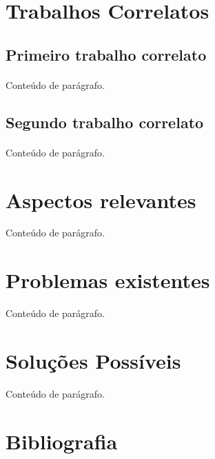 \documentclass[12pt]{article}
\begin{document}
\section{Trabalhos Correlatos} \label{sec:correlated}
\subsection{Primeiro trabalho correlato}
\paragraph{}
Conteúdo de parágrafo.

\subsection{Segundo trabalho correlato}
\paragraph{}
Conteúdo de parágrafo.

\section{Aspectos relevantes} \label{sec:aspects}
Conteúdo de parágrafo.

\section{Problemas existentes} \label{sec:problems}
Conteúdo de parágrafo.

\section{Soluções Possíveis} \label{sec:solutions}
Conteúdo de parágrafo.

\newpage
\section{Bibliografia}


\end{document}
